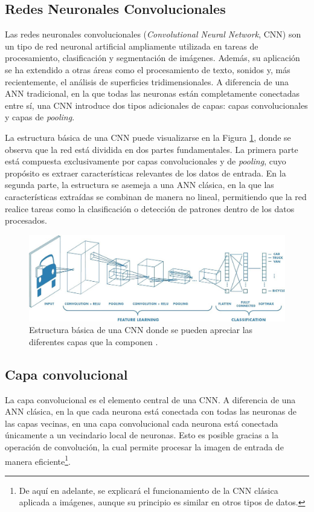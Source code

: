 \subsection{Redes Neuronales Convolucionales}
\label{section2:cnn}
Las redes neuronales convolucionales (\textit{Convolutional Neural Network}, CNN) \cite{lecun_backpropagation_1989, leCUM_CNN} son un tipo de red neuronal artificial ampliamente utilizada en tareas de procesamiento, clasificación y segmentación de imágenes. Además, su aplicación se ha extendido a otras áreas como el procesamiento de texto, sonidos y, más recientemente, el análisis de superficies tridimensionales. A diferencia de una ANN tradicional, en la que todas las neuronas están completamente conectadas entre sí, una CNN introduce dos tipos adicionales de capas: capas convolucionales y capas de \textit{pooling}.

La estructura básica de una CNN puede visualizarse en la Figura \ref{fig:cnnExample}, donde se observa que la red está dividida en dos partes fundamentales. La primera parte está compuesta exclusivamente por capas convolucionales y de \textit{pooling}, cuyo propósito es extraer características relevantes de los datos de entrada. En la segunda parte, la estructura se asemeja a una ANN clásica, en la que las características extraídas se combinan de manera no lineal, permitiendo que la red realice tareas como la clasificación o detección de patrones dentro de los datos procesados.

\begin{figure}[h]
    \centering
    \includegraphics[width=\linewidth]{figures/2_theory/cnnExample.jpeg}
    \caption[Estructura básica de una red neuronal convolucional]{Estructura básica de una CNN donde se pueden apreciar las diferentes capas que la componen \cite{prabhu_understanding_2019}.}
    \label{fig:cnnExample}
\end{figure}

\subsection{Capa convolucional}
La capa convolucional es el elemento central de una CNN. A diferencia de una ANN clásica, en la que cada neurona está conectada con todas las neuronas de las capas vecinas, en una capa convolucional cada neurona está conectada únicamente a un vecindario local de neuronas. Esto es posible gracias a la operación de convolución, la cual permite procesar la imagen de entrada de manera eficiente\footnote{De aquí en adelante, se explicará el funcionamiento de la CNN clásica aplicada a imágenes, aunque su principio es similar en otros tipos de datos.}.

